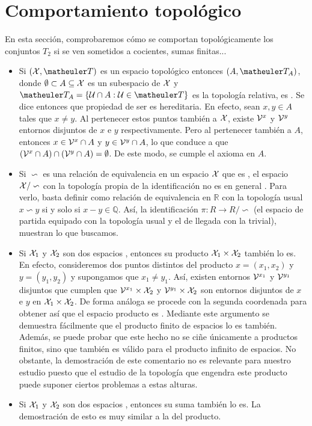 \section{Comportamiento topológico} 

En esta sección, comprobaremos cómo se comportan topológicamente los conjuntos $T_2$ si se ven sometidos a cocientes, sumas finitas...

\begin{itemize}
\item Si $(\X,\T)$ es un espacio topológico \hausdorff entonces $(A,\T_A)$, donde $\emptyset \subset A \subseteq \mathcal{X}$ es un subespacio de $\mathcal{X}$ y $\T_A=\{\U\cap A: \U\in \T \}$ es la topología relativa, es \hausdorff. Se dice entonces que propiedad de ser \hausdorff es hereditaria. 
En efecto, sean $x,y\in A$ tales que $x\neq y$. Al pertenecer estos puntos también a $\mathcal{X}$, existe $\mathcal{V}^x$ y $\mathcal{V}^y$ entornos disjuntos de $x$ e $y$ respectivamente. Pero al pertenecer también a $A$, entonces $x\in \mathcal{V}^x \cap A$ y $y\in \mathcal{V}^y \cap A$, lo que conduce a que $(\mathcal{V}^x\cap A)\cap (\mathcal{V}^y\cap A)=\emptyset$. De este modo, se cumple el axioma \hausdorff en $A$.  
\item Si $\backsim$ es una relación de equivalencia en un espacio $\mathcal{X}$ que es \hausdorff, el espacio $\mathcal{X}/\backsim$ con la topología propia de la identificación no es en general \hausdorff. Para verlo, basta definir como relación de equivalencia en $\mathbb{R}$ con la topología usual $x\backsim y$ si y solo si $x-y\in \mathbb{Q}$. Así, la identificación $\pi: R\to R/\backsim$ (el espacio de partida equipado con la topología usual y el de llegada con la trivial), muestran lo que buscamos.
\item Si $\mathcal{X}_1$ y $\mathcal{X}_2$ son dos espacios \hausdorff, entonces su producto $\mathcal{X}_1\times \mathcal{X}_2$ también lo es. En efecto, consideremos dos puntos distintos del producto $x=(x_1,x_2)$ y $y=(y_1,y_2)$ y supongamos que $x_1\neq y_1$. Así, existen entornos $\mathcal{V}^{x_1}$ y $\mathcal{V}^{y_1}$ disjuntos que cumplen que $\mathcal{V}^{x_1}\times \mathcal{X}_2$ y $\mathcal{V}^{y_1}\times \mathcal{X}_2$ son entornos disjuntos de $x$ e $y$ en $\mathcal{X}_1\times \mathcal{X}_2$. De forma análoga se procede con la segunda coordenada para obtener así que el espacio producto es \hausdorff. Mediante este argumento se demuestra fácilmente que el producto finito de espacios \hausdorff lo es también. Además, se puede probar que este hecho no se ciñe únicamente a productos finitos, sino que también es válido para el producto infinito de espacios. No obstante, la demostración de este comentario no es relevante para nuestro estudio puesto que el estudio de la topología que engendra este producto puede suponer ciertos problemas a estas alturas.
\item Si $\mathcal{X}_1$ y $\mathcal{X}_2$ son dos espacios \hausdorff, entonces su suma también lo es. La demostración de esto es muy similar a la del producto.
\end{itemize}